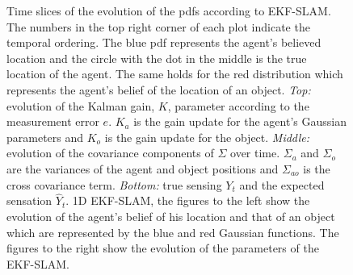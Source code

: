 \begin{figure}
\centering
{}
\caption{Time slices of the evolution of the pdfs according to EKF-SLAM. The numbers in the top right corner of each plot indicate the temporal ordering.
The blue pdf represents the agent's believed location and the circle with the dot in the middle is the true location of the agent. The same holds 
for the red distribution which represents the agent's belief of the location of an object.
\textit{Top:} evolution of the Kalman gain, $K$, parameter according to the measurement error $e$. $K_a$ is the gain update for the 
agent's Gaussian parameters and $K_o$ is the gain update for the object. \textit{Middle:} evolution of the covariance components of 
$\Sigma$ over time. $\Sigma_a$ and $\Sigma_o$ are the variances of the agent and object positions and $\Sigma_{ao}$ is the cross covariance 
term. \textit{Bottom:} true sensing $Y_t$ and the expected sensation $\hat{Y}_t$.
1D EKF-SLAM, the figures to the left show the evolution of the agent's belief of his location and that of an 
object which are represented by the blue and red Gaussian functions. The figures to the right show the evolution of the parameters of the EKF-SLAM.}
\label{fig:slam}


\end{figure}

